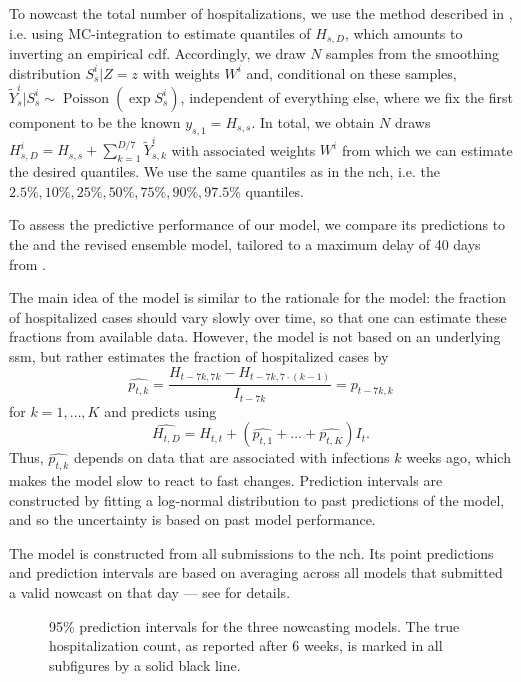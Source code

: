 To nowcast the total number of hospitalizations, we use the method described in , i.e. using MC-integration to estimate quantiles of $H_{s, D}$, which amounts to inverting an empirical \gls{cdf}. Accordingly, we draw $N$ samples from the smoothing distribution $S^{i}_{s} | Z = z$ with weights $W^{i}$ and, conditional on these samples, $\tilde Y^{i}_{s} | S^{i}_s \sim \operatorname{Poisson} \left( \exp S^{i}_s \right)$, independent of everything else, where we fix the first component to be the known $y_{s,1} = H_{s,s}$. In total, we obtain $N$ draws $H^{i}_{s,D} = H_{s,s} + \sum_{k = 1}^{D / 7} \tilde Y^{i}_{s,k}$ with associated weights $W^{i}$ from which we can estimate the desired quantiles. We use the same quantiles as in the \gls{nch}, i.e. the $2.5\%, 10\%, 25\%, 50\%, 75\%, 90\%, 97.5\%$ quantiles. 

To assess the predictive performance of our model, we compare its predictions to the \ilmpropsmall and the revised ensemble model, \ensemble tailored to a maximum delay of 40 days from \citep[Section 3.7]{Wolffram2023Collaborative}. 

The main idea of the \ilmpropsmall model is similar to the rationale for the \ssm model: the fraction of hospitalized cases should vary slowly over time, so that one can estimate these fractions from available data. However, the \ilmpropsmall model is not based on an underlying \gls{ssm}, but rather estimates the fraction of hospitalized cases by 
$$
\widehat {p_{t,k}} = \frac{H_{t - 7k, 7k} - H_{t - 7k, 7\cdot(k - 1)}}{I_{t - 7k}} = p_{t - 7k,k}
$$
for $k = 1, \dots, K$ and predicts using 
$$
\widehat{H_{t,D}} = H_{t,t} + \left(\widehat{p_{t,1}} + \dots + \widehat{p_{t,K}}\right)  I_{t}.
$$
Thus, $\widehat{p_{t,k}}$ depends on data that are associated with infections $k$ weeks ago, which makes the model slow to react to fast changes. 
Prediction intervals are constructed by fitting a log-normal distribution to past predictions of the model, and so the uncertainty is based on past model performance. 

The \ensemble model is constructed from all submissions to the \gls{nch}. Its point predictions and prediction intervals are based on averaging across all models that submitted a valid nowcast on that day --- see \citep{Wolffram2023Collaborative} for details.

\begin{figure}
    \centering
    \resizebox{\textwidth}{!}{}
    \caption{95\% prediction intervals for the three nowcasting models. The true hospitalization count, as reported after 6 weeks, is marked in all subfigures by a solid black line.}
    \label{fig:hospitalization_nowcasts_all_models}
\end{figure}

